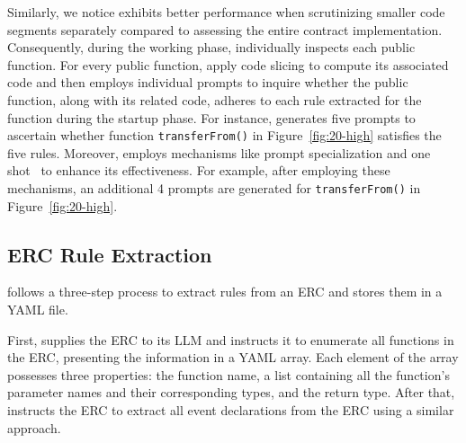 Similarly, we notice \Tool{} exhibits better performance 
when scrutinizing smaller code segments separately
compared to assessing the entire contract implementation. 
Consequently, during the working phase, \Tool{} individually 
inspects each public function. For every public function, \Tool{} apply code 
slicing to compute 
its associated code and then employs individual prompts 
to inquire whether the public function, along with its related code, 
adheres to each rule extracted for the function during the startup phase. 
For instance, \Tool{} generates five prompts to 
ascertain whether function \texttt{transferFrom()} 
in Figure~\ref{fig:20-high} 
satisfies the five rules. 
Moreover, \Tool{} employs mechanisms like prompt specialization 
and one shot~\cite{duan2017one} to enhance its effectiveness. 
For example, after employing these mechanisms, an additional 4 prompts are generated for \texttt{transferFrom()} in Figure~\ref{fig:20-high}.



\subsection{ERC Rule Extraction}


\Tool{} follows a three-step process to extract rules from an ERC and stores them in a YAML file.

First, \Tool{} supplies the ERC to its LLM and 
instructs it to enumerate all functions in the ERC, presenting the information in a YAML array. 
Each element of the array possesses three properties: the function name, a list containing all 
the function’s parameter names and their corresponding types, and the return type.
After that, \Tool{} instructs the ERC to extract all event declarations from the ERC using a 
similar approach.


